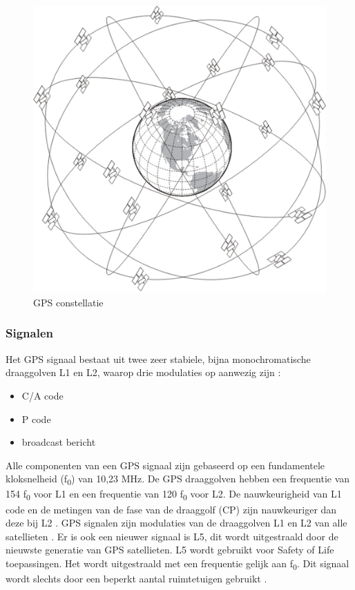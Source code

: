 \begin{figure}[hpb]
 	\includegraphics[scale=0.95]{GPS.png}
 	\caption{GPS constellatie \cite{LImgGPS}}
 	\label{imgGPS}
 \end{figure}

\subsubsection{Signalen}
Het GPS signaal bestaat uit twee zeer stabiele, bijna monochromatische draaggolven L1 en L2, waarop drie modulaties op aanwezig zijn \cite{LBibBeiDou4}:
\begin{itemize}
	\item C/A code
	\item P code
	\item broadcast bericht
\end{itemize}
Alle componenten van een GPS signaal zijn gebaseerd op een fundamentele kloksnelheid (f\textsubscript{0}) van 10,23 MHz. De GPS draaggolven hebben een frequentie van 154 f\textsubscript{0} voor L1 en een frequentie van 120 f\textsubscript{0} voor L2\cite{LBibGPS2}. De nauwkeurigheid van L1 code en de metingen van de fase van de draaggolf (CP) zijn nauwkeuriger dan deze bij L2 \cite{LBibBeiDou4}. GPS signalen zijn modulaties van de draaggolven L1 en L2 van alle satellieten \cite{LBibGPS3}. Er is ook een nieuwer signaal is L5, dit wordt uitgestraald door de nieuwste generatie van GPS satellieten. L5 wordt gebruikt voor Safety of Life toepassingen. Het wordt uitgestraald met een frequentie gelijk aan f\textsubscript{0}. Dit signaal wordt slechts door een beperkt aantal ruimtetuigen gebruikt \cite{LBibGNSS9}.

